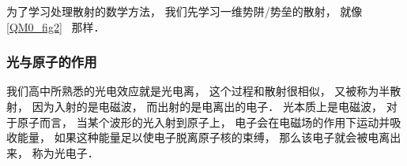 为了学习处理散射的数学方法， 我们先学习一维势阱/势垒的散射， 就像\autoref{QM0_fig2}~ 那样．

\subsubsection{光与原子的作用}
我们高中所熟悉的光电效应就是光电离， 这个过程和散射很相似， 又被称为半散射， 因为入射的是电磁波， 而出射的是电离出的电子． 光本质上是电磁波， 对于原子而言， 当某个波形的光入射到原子上， 电子会在电磁场的作用下运动并吸收能量， 如果这种能量足以使电子脱离原子核的束缚， 那么该电子就会被电离出来， 称为光电子．
